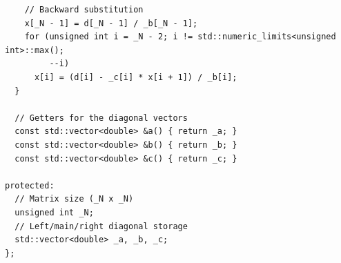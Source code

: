 \documentclass{article}
\begin{document}
\begin{verbatim}
    // Backward substitution
    x[_N - 1] = d[_N - 1] / _b[_N - 1];
    for (unsigned int i = _N - 2; i != std::numeric_limits<unsigned int>::max();
         --i)
      x[i] = (d[i] - _c[i] * x[i + 1]) / _b[i];
  }

  // Getters for the diagonal vectors
  const std::vector<double> &a() { return _a; }
  const std::vector<double> &b() { return _b; }
  const std::vector<double> &c() { return _c; }

protected:
  // Matrix size (_N x _N)
  unsigned int _N;
  // Left/main/right diagonal storage
  std::vector<double> _a, _b, _c;
};

\end{verbatim}
\end{document}
